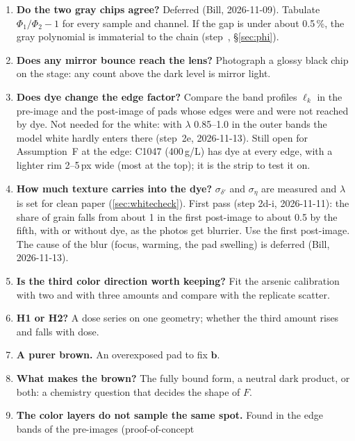 \documentclass[11pt,letter]{article}
\makeatletter
\newcommand{\vb}{\mathbf{b}}
\newcommand{\sno}[1]{step~\@nameuse{stepno@#1}}
\newcommand{\psref}[1]{\sno{#1}, \S\ref{#1}}  %
\makeatother
\begin{document}
\begin{enumerate}[label=\arabic*., ref=\arabic*]
  \item \label{op:phi} \textbf{Do the two gray chips agree?}  Deferred
    (Bill, 2026-11-09).  Tabulate
    $\Phi_1/\Phi_2 - 1$ for every sample and channel.  If the gap is under
    about 0.5\,\%, the gray polynomial is immaterial to the chain
    (\psref{sec:phi}).
  \item \label{op:specular} \textbf{Does any mirror bounce reach the
    lens?}  Photograph a glossy black chip on the stage: any count above
    the dark level is mirror light.
  \item \label{op:dyededge} \textbf{Does dye change the edge factor?}
    Compare the band profiles $\ell_k$ in the pre-image and the post-image
    of pads whose edges were and were not reached by dye.  Not needed for
    the white: with $\lambda$ 0.85--1.0 in the outer bands the model white
    hardly enters there (step~2e, 2026-11-13).  Still open for
    Assumption~F at the edge: C1047 (400\,\textmu g/L) has dye at every
    edge, with a lighter rim 2--5\,px wide (most at the top); it is the
    strip to test it on.
  \item \label{op:texture} \textbf{How much texture carries into the
    dye?}  $\sigma_{\delta'}$ and $\sigma_\eta$ are measured and $\lambda$
    is set for clean paper (\cref{sec:whitecheck}).  First pass (step
    2d-i, 2026-11-11): the share of grain falls from about 1 in the first
    post-image to about 0.5 by the fifth, with or without dye, as the
    photos get blurrier.  Use the first post-image.  The cause of the blur
    (focus, warming, the pad swelling) is deferred (Bill, 2026-11-13).
  \item \label{op:third} \textbf{Is the third color direction worth
    keeping?}  Fit the arsenic calibration with two and with three amounts
    and compare with the replicate scatter.
  \item \label{op:sites} \textbf{H1 or H2?}  A dose series on one
    geometry; whether the third amount rises and falls with dose.
  \item \label{op:purebrown} \textbf{A purer brown.}  An overexposed pad to
    fix $\vb$.
  \item \label{op:brown} \textbf{What makes the brown?}  The fully bound
    form, a neutral dark product, or both: a chemistry question that
    decides the shape of $F$.
  \item \label{op:bayer} \textbf{The color layers do not sample the same
    spot.}  Found in the edge bands of the pre-images (proof-of-concept

\end{enumerate}
\end{document}
